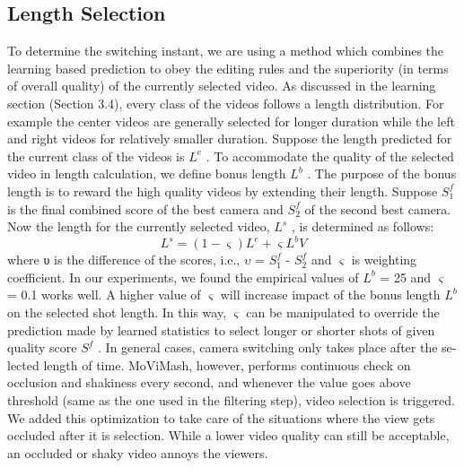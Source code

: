 \documentclass{sig-alternate}
\begin{document}
\subsection{Length Selection}
To determine the switching instant, we are using a method which
combines the learning based prediction to obey the editing rules and
the superiority (in terms of overall quality) of the currently selected
video. As discussed in the learning section (Section 3.4), every
class of the videos follows a length distribution. For example the
center videos are generally selected for longer duration while the
left and right videos for relatively smaller duration.
Suppose the length predicted for the current class of the videos
is $L^e$ . To accommodate the quality of the selected video in length
calculation, we define bonus length $L^b$ . The purpose of the bonus
length is to reward the high quality videos by extending their length.
Suppose $S^f_1$ is the final combined score of the best camera and $S^f_2$
of the second best camera. Now the length for the currently selected
video, $L^s$ , is determined as follows:
\[L^s = (1 - \varsigma)L^e + \varsigma L^bV\tag{18}\]
where υ is the difference of the scores, i.e., $\upsilon$ = $S^f_1$ - $S^f_2$
and $\varsigma$ is weighting coefficient. In our experiments, we found the empirical
values of $L^b$ = 25 and $\varsigma$ = 0.1 works well. A higher value of
$\varsigma$ will increase impact of the bonus length $L^b$ on the selected shot
length. In this way, $\varsigma$ can be manipulated to override the prediction
made by learned statistics to select longer or shorter shots of given
quality score $S^f$ .
In general cases, camera switching only takes place after the se-
lected length of time. MoViMash, however, performs continuous
check on occlusion and shakiness every second, and whenever the
value goes above threshold (same as the one used in the filtering
step), video selection is triggered. We added this optimization to
take care of the situations where the view gets occluded after it is
selection. While a lower video quality can still be acceptable, an
occluded or shaky video annoys the viewers.
\end{document}
